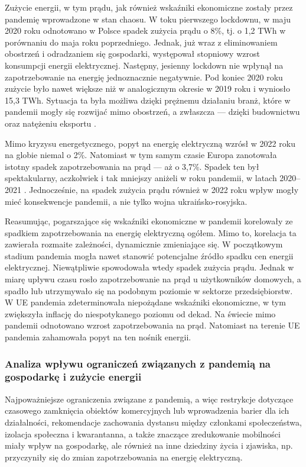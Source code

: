 \documentclass[polish, twoside, 12pt, a4paper]{article}
\theoremstyle{definition}
\theoremstyle{plain}
\theoremstyle{remark}
\begin{document}
Zużycie energii, w tym prądu, jak również wskaźniki ekonomiczne zostały przez pandemię wprowadzone w stan chaosu. W toku pierwszego lockdownu, w maju 2020 roku odnotowano w Polsce spadek zużycia prądu o 8\%, tj. o 1,2 TWh w porównaniu do maja roku poprzedniego. Jednak, już wraz z eliminowaniem obostrzeń i odradzaniem się gospodarki, występował stopniowy wzrost konsumpcji energii elektrycznej. Następny, jesienny lockdown nie wpłynął na zapotrzebowanie na energię jednoznacznie negatywnie. Pod koniec 2020 roku zużycie było nawet większe niż w analogicznym okresie w 2019 roku i wyniosło 15,3 TWh. Sytuacja ta była możliwa dzięki prężnemu działaniu branż, które w pandemii mogły się rozwijać mimo obostrzeń, a zwłaszcza --- dzięki budownictwu oraz natężeniu eksportu \parencite{tygodnikprzeglad2021}. 

Mimo kryzysu energetycznego, popyt na energię elektryczną wzrósł w 2022 roku na globie niemal o 2\%. Natomiast w tym samym czasie Europa zanotowała istotny spadek zapotrzebowania na prąd --- aż o 3,7\%. Spadek ten był spektakularny, aczkolwiek i tak mniejszy aniżeli w roku pandemii, w latach 2020--2021 \parencite{maciuch2023}. Jednocześnie, na spadek zużycia prądu również w 2022 roku wpływ mogły mieć konsekwencje pandemii, a nie tylko wojna ukraińsko-rosyjska. 

Reasumując, pogarszające się wskaźniki ekonomiczne w pandemii korelowały ze spadkiem zapotrzebowania na energię elektryczną ogółem. Mimo to, korelacja ta zawierała rozmaite zależności, dynamicznie zmieniające się. W początkowym stadium pandemia mogła nawet stanowić potencjalne źródło spadku cen energii elektrycznej. Niewątpliwie spowodowała wtedy spadek zużycia prądu. Jednak w miarę upływu czasu rosło zapotrzebowanie na prąd u użytkowników domowych, a spadło lub utrzymywało się na podobnym poziomie w sektorze przedsiębiorstw. W UE pandemia zdeterminowała niepożądane wskaźniki ekonomiczne, w tym zwiększyła inflację do niespotykanego poziomu od dekad. Na świecie mimo pandemii odnotowano wzrost zapotrzebowania na prąd. Natomiast na terenie UE pandemia zahamowała popyt na ten nośnik energii.


\subsubsection{Analiza wpływu ograniczeń związanych z pandemią na gospodarkę i zużycie energii}

Najpoważniejsze ograniczenia związane z pandemią, a więc restrykcje dotyczące czasowego zamknięcia obiektów komercyjnych lub wprowadzenia barier dla ich działalności, rekomendacje zachowania dystansu między członkami społeczeństwa, izolacja społeczna i kwarantanna, a także znaczące zredukowanie mobilności miały wpływ na gospodarkę, ale również na inne dziedziny życia i zjawiska, np. przyczyniły się do zmian zapotrzebowania na energię elektryczną.
\end{document}
